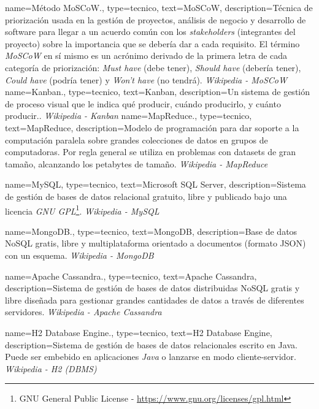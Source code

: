 {
    name={Método MoSCoW.},
  	type=tecnico,
    text={MoSCoW},
    description={Técnica de priorización usada en la gestión de proyectos, análisis de negocio y desarrollo de software para llegar a un acuerdo común con los \textit{stakeholders} (integrantes del proyecto) sobre la importancia que se debería dar a cada requisito. El término \textit{MoSCoW} en sí mismo es un acrónimo derivado de la primera letra de cada categoría de priorización: \textit{Must have} (debe tener), \textit{Should have} (debería tener), \textit{Could have} (podría tener) y \textit{Won't have} (no tendrá). \textit{Wikipedia - MoSCoW} \cite{wikimoscow}}
}
{
    name={Kanban.},
  	type=tecnico,
    text={Kanban},
    description={Un sistema de gestión de proceso visual que le indica qué producir, cuándo producirlo, y cuánto producir.. \textit{Wikipedia - Kanban} \cite{wikikanban}}
}
{
    name={MapReduce.},
  	type=tecnico,
    text={MapReduce},
    description={Modelo de programación para dar soporte a la computación paralela sobre grandes colecciones de datos en grupos de computadoras. Por regla general se utiliza en problemas con datasets de gran tamaño, alcanzando los petabytes de tamaño. \textit{Wikipedia - MapReduce} \cite{wikimapreduce}}
}


{
    name={MySQL},
  	type=tecnico,
    text={Microsoft SQL Server},
    description={Sistema de gestión de bases de datos relacional gratuito, libre y publicado bajo una licencia \textit{GNU GPL}\footnote{GNU General Public License - \url{https://www.gnu.org/licenses/gpl.html}}. \textit{Wikipedia - MySQL} \cite{wikimysql}}
}

{
    name={MongoDB.},
  	type=tecnico,
    text={MongoDB},
    description={Base de datos NoSQL gratis, libre y multiplataforma orientado a documentos (formato JSON) con un esquema. \textit{Wikipedia - MongoDB} \cite{wikimongodb}}
}

{
	name={Apache Cassandra.},
  	type=tecnico,
    text={Apache Cassandra},
    description={Sistema de gestión de bases de datos distribuidas NoSQL gratis y libre diseñada para gestionar grandes cantidades de datos a través de diferentes servidores. \textit{Wikipedia - Apache Cassandra} \cite{wikicassandra}}
}

{
    name={H2 Database Engine.},
  	type=tecnico,
    text={H2 Database Engine},
    description={Sistema de gestión de bases de datos relacionales escrito en Java. Puede ser embebido en aplicaciones \textit{Java} o lanzarse en modo cliente-servidor. \textit{Wikipedia - H2 (DBMS)} \cite{wikih2}}
}

